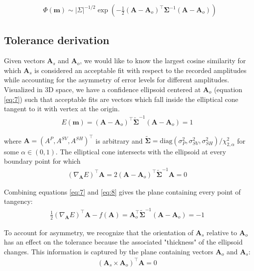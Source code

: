 \documentclass[preprint]{seismica}
\begin{document}
    \begin{align} \label{eq:6}
      &\Phi(\bm{m}) \sim |\Sigma|^{-1/2} \exp \left( - \frac{1}{2} (\bm{A} - \bm{A}_o)^\top \bm{\Sigma}^{-1} (\bm{A} - \bm{A}_o) \right)
    \end{align}

  \subsection{Tolerance derivation}
    Given vectors $\bm{A}_s$ and $\bm{A}_o$, we would like to know the largest cosine
    similarity for which $\bm{A}_s$ is considered an acceptable fit with respect to the recorded amplitudes
    while accounting for the asymmetry of error levels for different amplitudes. Visualized in 3D
    space, we have a confidence ellipsoid centered at $\bm{A}_o$ (equation \ref{eq:7}) such that
    acceptable fits are vectors which fall inside the elliptical cone tangent to it with vertex at the
    origin.
    \begin{align} \label{eq:7}
      E(\bm{m}) = (\bm{A} - \bm{A}_o)^\top \tilde{\bm{\Sigma}}^{-1} (\bm{A} - \bm{A}_o)  = 1
    \end{align}
    
    \noindent where $\bm{A} = (A^P, A^{SV}, A^{SH})^\top$ is arbitrary
    and $\tilde{\bm{\Sigma}} = \text{diag}(\sigma_P^2, \sigma_{SV}^2, \sigma_{SH}^2)/\chi^2_{2,\alpha}$ for some $\alpha \in (0,1)$. The elliptical
    cone intersects with the ellipsoid at every boundary point for which
    \begin{align} \label{eq:8}
      (\nabla_{\bm{A}} E)^\top \bm{A} = 2(\bm{A} - \bm{A}_o)^\top \tilde{\bm{\Sigma}}^{-1} \bm{A} = 0
    \end{align}
    
    \noindent Combining equations \ref{eq:7} and \ref{eq:8} gives the plane containing every point of 
    tangency:
    \begin{align} \label{eq:9}
      \frac{1}{2} (\nabla_{\bm{A}} E)^\top \bm{A} - f(\bm{A}) = 
              \bm{A}_o^\top \tilde{\bm{\Sigma}}^{-1} (\bm{A} - \bm{A}_o)  = -1
    \end{align}

    To account for asymmetry, we recognize that the orientation of $\bm{A}_s$ relative to $\bm{A}_o$
    has an effect on the tolerance because the associated "thickness" of the ellipsoid changes.
    This information is captured by the plane containing vectors $\bm{A}_o$ and $\bm{A}_s$:
    \begin{align} \label{eq:10}
      (\bm{A}_s \times \bm{A}_o)^\top \bm{A} = 0
    \end{align}
\end{document}
